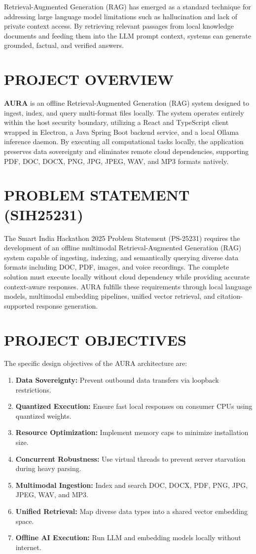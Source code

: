\documentclass[12pt,a4paper]{report}
\begin{document}
Retrieval-Augmented Generation (RAG) has emerged as a standard technique for addressing large language model limitations such as hallucination and lack of private context access. By retrieving relevant passages from local knowledge documents and feeding them into the LLM prompt context, systems can generate grounded, factual, and verified answers.

\section{PROJECT OVERVIEW}
\textbf{AURA} is an offline Retrieval-Augmented Generation (RAG) system designed to ingest, index, and query multi-format files locally. The system operates entirely within the host security boundary, utilizing a React and TypeScript client wrapped in Electron, a Java Spring Boot backend service, and a local Ollama inference daemon. By executing all computational tasks locally, the application preserves data sovereignty and eliminates remote cloud dependencies, supporting PDF, DOC, DOCX, PNG, JPG, JPEG, WAV, and MP3 formats natively.

\section{PROBLEM STATEMENT (SIH25231)}
The Smart India Hackathon 2025 Problem Statement (PS-25231) requires the development of an offline multimodal Retrieval-Augmented Generation (RAG) system capable of ingesting, indexing, and semantically querying diverse data formats including DOC, PDF, images, and voice recordings. The complete solution must execute locally without cloud dependency while providing accurate context-aware responses. AURA fulfills these requirements through local language models, multimodal embedding pipelines, unified vector retrieval, and citation-supported response generation.

\section{PROJECT OBJECTIVES}
The specific design objectives of the AURA architecture are:
\begin{enumerate}
    \item \textbf{Data Sovereignty:} Prevent outbound data transfers via loopback restrictions.
    \item \textbf{Quantized Execution:} Ensure fast local responses on consumer CPUs using quantized weights.
    \item \textbf{Resource Optimization:} Implement memory caps to minimize installation size.
    \item \textbf{Concurrent Robustness:} Use virtual threads to prevent server starvation during heavy parsing.
    \item \textbf{Multimodal Ingestion:} Index and search DOC, DOCX, PDF, PNG, JPG, JPEG, WAV, and MP3.
    \item \textbf{Unified Retrieval:} Map diverse data types into a shared vector embedding space.
    \item \textbf{Offline AI Execution:} Run LLM and embedding models locally without internet.
\end{enumerate}
\end{document}
